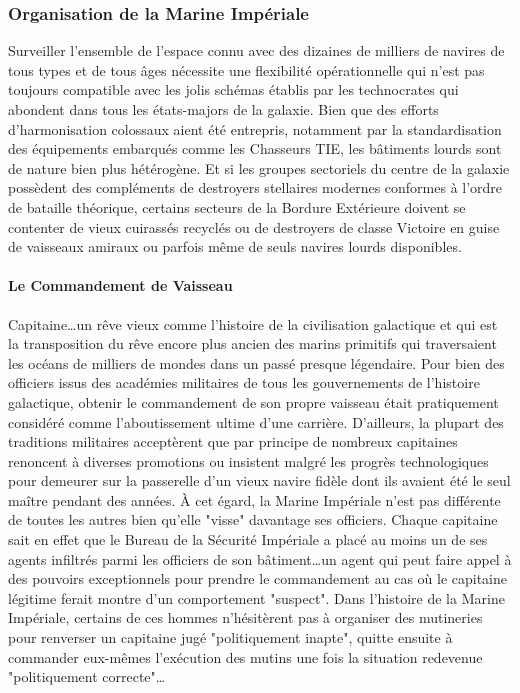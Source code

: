 \documentclass[twoside]{article}
\begin{document}
\subsubsection{Organisation de la Marine Impériale}
Surveiller l'ensemble de l'espace connu avec des dizaines de milliers de navires de tous types et de tous âges nécessite une flexibilité opérationnelle qui n'est pas toujours compatible avec les jolis schémas établis par les technocrates qui abondent dans tous les états-majors de la galaxie. Bien que des efforts d'harmonisation colossaux aient été entrepris, notamment par la standardisation des équipements embarqués comme les Chasseurs TIE, les bâtiments lourds sont de nature bien plus hétérogène. Et si les groupes sectoriels du centre de la galaxie possèdent des compléments de destroyers stellaires modernes conformes à l'ordre de bataille théorique, certains secteurs de la Bordure Extérieure doivent se contenter de vieux cuirassés recyclés ou de destroyers de classe Victoire en guise de vaisseaux amiraux ou parfois même de seuls navires lourds disponibles. 

\paragraph{Le Commandement de Vaisseau}
Capitaine\ldots un rêve vieux comme l'histoire de la civilisation galactique et qui est la transposition du rêve encore plus ancien des marins primitifs qui traversaient les océans de milliers de mondes dans un passé presque légendaire. Pour bien des officiers issus des académies militaires de tous les gouvernements de l'histoire galactique, obtenir le commandement de son propre vaisseau était pratiquement considéré comme l'aboutissement ultime d'une carrière. D'ailleurs, la plupart des traditions militaires acceptèrent que par principe de nombreux capitaines renoncent à diverses promotions ou insistent malgré les progrès technologiques pour demeurer sur la passerelle d'un vieux navire fidèle dont ils avaient été le seul ma\^{i}tre pendant des années. À cet égard, la Marine Impériale n'est pas différente de toutes les autres bien qu'elle "visse" davantage ses officiers. Chaque capitaine sait en effet que le Bureau de la Sécurité Impériale a placé au moins un de ses agents infiltrés parmi les officiers de son bâtiment\ldots un agent qui peut faire appel à des pouvoirs exceptionnels pour prendre le commandement au cas où le capitaine légitime ferait montre d'un comportement "suspect". Dans l'histoire de la Marine Impériale, certains de ces hommes n'hésitèrent pas à organiser des mutineries pour renverser un capitaine jugé "politiquement inapte", quitte ensuite à commander eux-mêmes l'exécution des mutins une fois la situation redevenue "politiquement correcte"\ldots
\end{document}
